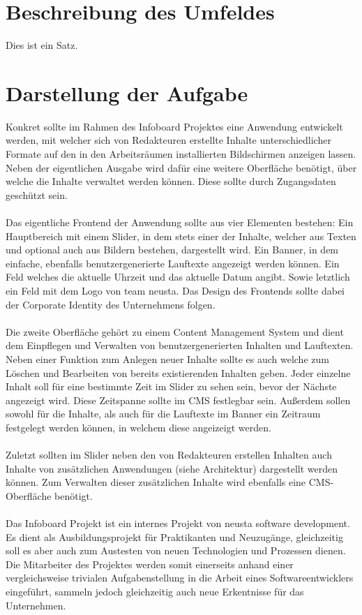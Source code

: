 \documentclass[a4paper, 11pt]{article}
\begin{document}
\tableofcontents
\newpage



\section{Beschreibung des Umfeldes}

Dies ist ein Satz.

\newpage

\section{Darstellung der Aufgabe}

Konkret sollte im Rahmen des Infoboard Projektes eine Anwendung entwickelt werden, mit welcher sich von Redakteuren erstellte Inhalte unterschiedlicher Formate auf den in den Arbeitsräumen installierten Bildschirmen anzeigen lassen. Neben der eigentlichen Ausgabe wird dafür eine weitere Oberfläche benötigt, über welche die Inhalte verwaltet werden können. Diese sollte durch Zugangsdaten geschützt sein. \\
\\ Das eigentliche Frontend der Anwendung sollte aus vier Elementen bestehen: Ein Hauptbereich mit einem Slider, in dem stets einer der Inhalte, welcher aus Texten und optional auch aus Bildern bestehen, dargestellt wird. Ein Banner, in dem einfache, ebenfalls benutzergenerierte Lauftexte angezeigt werden können. Ein Feld welches die aktuelle Uhrzeit und das aktuelle Datum angibt. Sowie letztlich ein Feld mit dem Logo von team neusta. Das Design des Frontends sollte dabei der Corporate Identity des Unternehmens folgen.\\
\\Die zweite Oberfläche gehört zu einem Content Management System und dient dem Einpflegen und Verwalten von benutzergenerierten Inhalten und Lauftexten. Neben einer Funktion zum Anlegen neuer Inhalte sollte es auch welche zum Löschen und Bearbeiten von bereits existierenden Inhalten geben. Jeder einzelne Inhalt soll für eine bestimmte Zeit im Slider zu sehen sein, bevor der Nächste angezeigt wird. Diese Zeitspanne sollte im CMS festlegbar sein. Außerdem sollen sowohl für die Inhalte, als auch für die Lauftexte im Banner ein Zeitraum festgelegt werden können, in welchem diese angeizeigt werden.\\
\\ Zuletzt sollten im Slider neben den von Redakteuren erstellen Inhalten auch Inhalte von zusätzlichen Anwendungen (siehe Architektur) dargestellt werden können. Zum Verwalten dieser zusätzlichen Inhalte wird ebenfalls eine CMS-Oberfläche benötigt.\\
\\ Das Infoboard Projekt ist ein internes Projekt von neusta software development. Es dient als Ausbildungsprojekt für Praktikanten und Neuzugänge, gleichzeitig soll es aber auch zum Austesten von neuen Technologien und Prozessen dienen. Die Mitarbeiter des Projektes werden somit einerseits anhand einer vergleichsweise trivialen Aufgabenstellung in die Arbeit eines Softwareentwicklers eingeführt, sammeln jedoch gleichzeitig auch neue Erkentnisse für das Unternehmen.
\end{document}
